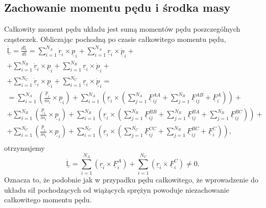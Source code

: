 \documentclass[12pt,a4paper,openright]{report} %
\begin{document}
\subsection{Zachowanie momentu pędu i środka masy}
\label{zachMomPed}
Całkowity moment pędu układu jest sumą momentów pędu poszczególnych cząsteczek. Obliczając pochodną po czasie całkowitego momentu pędu,
\begin{equation}
\begin{gathered}
\underline{\mathbb{\dot{L}}}=\frac{d \underline{\mathbb{L}}}{dt}=
\sum_{i=1}^{N_A} \underline{\dot{r}}_i \times \underline{p}_i +
\sum_{i=1}^{N_A} \underline{r}_i \times \underline{\dot{p}}_i + \\
+ \sum_{i=1}^{N_B} \underline{\dot{r}}_i \times \underline{p}_i + 
\sum_{i=1}^{N_B} \underline{r}_i \times \underline{\dot{p}}_i + \\
+ \sum_{i=1}^{N_C} \underline{\dot{r}}_i \times \underline{p}_i +
\sum_{i=1}^{N_C} \underline{r}_i \times \underline{\dot{p}}_i = \\
=\sum_{i=1}^{N_A}\left( \frac{\underline{p}_i}{m_i} \times
\underline{p}_i \right) + \sum_{i=1}^{N_A} \left(
\underline{r}_i \times \left( \sum_{j=1}^{N_A}
\underline{F}_{ij}^{AA} + \sum_{j=1}^{N_B}
\underline{F}_{ij}^{AB} + \underline{F}_i^A \right) \right)+ \\
%
+\sum_{i=1}^{N_B}\left( \frac{\underline{p}_i}{m_i} \times
\underline{p}_i \right) + \sum_{i=1}^{N_B} \left(
\underline{r}_i \times \left( \sum_{j=1}^{N_B}
\underline{F}_{ij}^{BB} + \sum_{j=1}^{N_B}
\underline{F}_{ij}^{BA} + \sum_{j=1}^{N_B}
\underline{F}_{ij}^{BC} \right) \right)+ \\
%
+\sum_{i=1}^{N_C}\left( \frac{\underline{p}_i}{m_i} \times
\underline{p}_i \right) + \sum_{i=1}^{N_C} \left(
\underline{r}_i \times \left( \sum_{j=1}^{N_C}
\underline{F}_{ij}^{CC} + \sum_{j=1}^{N_B}
\underline{F}_{ij}^{BC} + \underline{F}_{i}^{C} \right) \right),
\\
%
\end{gathered}
\end{equation}
%
otrzymujemy
\begin{equation}
\underline{\mathbb{\dot{L}}}=\sum_{i=1}^{N_A} \left(
\underline{r}_i \times \underline{F}_i^A \right) +
\sum_{i=1}^{N_C} \left( \underline{r}_i \times \underline{F}_i^C \right)\ne 0.
\end{equation}
%
Oznacza to, że podobnie jak w przypadku pędu całkowitego, że wprowadzenie do układu sił pochodzących od wiążących sprężyn powoduje niezachowanie całkowitego momentu pędu.
\newline
\end{document}
